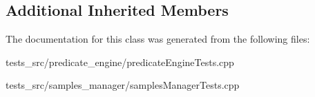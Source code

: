 \subsection*{Additional Inherited Members}


The documentation for this class was generated from the following files\+:\begin{DoxyCompactItemize}
\item 
tests\+\_\+src/predicate\+\_\+engine/predicate\+Engine\+Tests.\+cpp\item 
tests\+\_\+src/samples\+\_\+manager/samples\+Manager\+Tests.\+cpp\end{DoxyCompactItemize}
